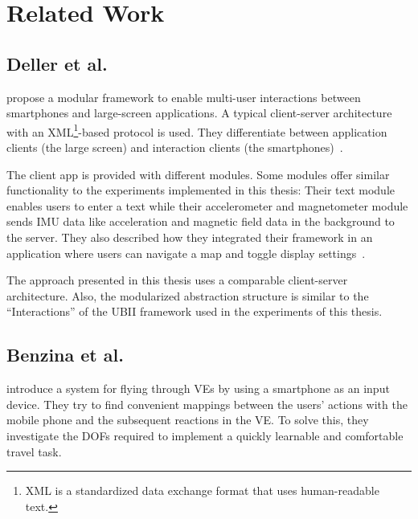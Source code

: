 \chapter{Related Work}\label{chapter:related-work}


\section{Deller et al.\@}\label{section:deller-2011}
\citeauthor{Deller.2011} propose a modular framework to enable multi-user interactions between smartphones and large-screen applications. A typical client-server architecture with an XML\footnote{XML is a standardized data exchange format that uses human-readable text.}-based protocol is used. They differentiate between application clients (the large screen) and interaction clients (the smartphones)~\cite{Deller.2011}.

The client app is provided with different modules. Some modules offer similar functionality to the experiments implemented in this thesis: Their text module enables users to enter a text while their accelerometer and magnetometer module sends \gls{IMU} data like acceleration and magnetic field data in the background to the server. They also described how they integrated their framework in an application where users can navigate a map and toggle display settings~\cite{Deller.2011}.

The approach presented in this thesis uses a comparable client-server architecture. Also, the modularized abstraction structure is similar to the \enquote{Interactions} of the \gls{UBII} framework used in the experiments of this thesis.


\section{Benzina et al.\@}\label{section:benzina-2011}
\citeauthor{Benzina.2011} introduce a system for flying through \glspl{VE} by using a smartphone as an input device.
They try to find convenient mappings between the users' actions with the mobile phone and the subsequent reactions in the \gls{VE}. To solve this, they investigate the \glspl{DOF} required to implement a quickly learnable and comfortable travel task.

